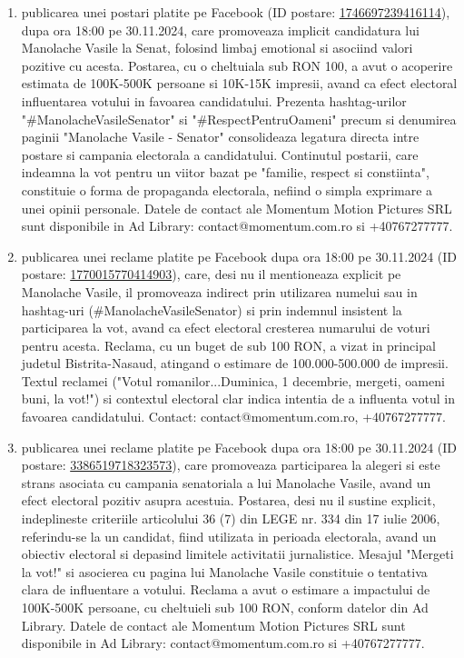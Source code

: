 \documentclass[a4paper,12pt]{article}
\begin{document}
\begin{enumerate}[leftmargin=*, label=\arabic*.)]
    \item publicarea unei postari platite pe Facebook (ID postare: \href{https://www.facebook.com/ads/library/?id=1746697239416114}{1746697239416114}), dupa ora 18:00 pe 30.11.2024, care promoveaza implicit candidatura lui Manolache Vasile la Senat, folosind limbaj emotional si asociind valori pozitive cu acesta.  Postarea, cu o cheltuiala sub RON 100, a avut o acoperire estimata de 100K-500K persoane si 10K-15K impresii, avand ca efect electoral influentarea votului in favoarea candidatului.  Prezenta hashtag-urilor "\#ManolacheVasileSenator" si "\#RespectPentruOameni" precum si denumirea paginii "Manolache Vasile - Senator" consolideaza legatura directa intre postare si campania electorala a candidatului.  Continutul postarii, care indeamna la vot pentru un viitor bazat pe "familie, respect si constiinta", constituie o forma de propaganda electorala, nefiind o simpla exprimare a unei opinii personale.  Datele de contact ale Momentum Motion Pictures SRL sunt disponibile in Ad Library: contact@momentum.com.ro si +40767277777.
    \item publicarea unei reclame platite pe Facebook dupa ora 18:00 pe 30.11.2024 (ID postare: \href{https://www.facebook.com/ads/library/?id=1770015770414903}{1770015770414903}), care, desi nu il mentioneaza explicit pe Manolache Vasile, il promoveaza indirect prin utilizarea numelui sau in hashtag-uri (\#ManolacheVasileSenator) si prin indemnul insistent la participarea la vot, avand ca efect electoral cresterea numarului de voturi pentru acesta.  Reclama, cu un buget de sub 100 RON, a vizat in principal judetul Bistrita-Nasaud, atingand o estimare de 100.000-500.000 de impresii.  Textul reclamei ("Votul romanilor...Duminica, 1 decembrie, mergeti, oameni buni, la vot!")  si contextul electoral clar indica intentia de a influenta votul in favoarea candidatului.  Contact: contact@momentum.com.ro, +40767277777.
    \item publicarea unei reclame platite pe Facebook dupa ora 18:00 pe 30.11.2024 (ID postare: \href{https://www.facebook.com/ads/library/?id=3386519718323573}{3386519718323573}), care promoveaza participarea la alegeri si este strans asociata cu campania senatoriala a lui Manolache Vasile, avand un efect electoral pozitiv asupra acestuia.  Postarea, desi nu il sustine explicit, indeplineste criteriile articolului 36 (7) din LEGE nr. 334 din 17 iulie 2006, referindu-se la un candidat, fiind utilizata in perioada electorala, avand un obiectiv electoral si depasind limitele activitatii jurnalistice.  Mesajul "Mergeti la vot!" si asocierea cu pagina lui Manolache Vasile constituie o tentativa clara de influentare a votului.  Reclama a avut o estimare a impactului de 100K-500K persoane, cu cheltuieli sub 100 RON, conform datelor din Ad Library.  Datele de contact ale Momentum Motion Pictures SRL sunt disponibile in Ad Library: contact@momentum.com.ro si +40767277777.

\end{enumerate}
\end{document}
